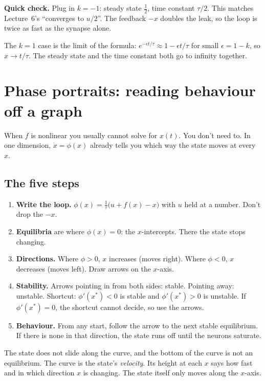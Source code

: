 \documentclass[11pt,letterpaper]{article}
\begin{document}
\textbf{Quick check.} Plug in $k = -1$: steady state $\tfrac12$, time constant $\tau/2$. This matches Lecture~6's ``converges to $u/2$''. The feedback $-x$ doubles the leak, so the loop is twice as fast as the synapse alone.

The $k = 1$ case is the limit of the formula: $e^{-\epsilon t/\tau} \approx 1 - \epsilon t/\tau$ for small $\epsilon = 1 - k$, so $x \to t/\tau$. The steady state and the time constant both go to infinity together.

\section{Phase portraits: reading behaviour off a graph}

When $f$ is nonlinear you usually cannot solve for $x(t)$. You don't need to. In one dimension, $\dot x = \phi(x)$ already tells you which way the state moves at every $x$.

\subsection*{The five steps}
\begin{enumerate}
\item \textbf{Write the loop.} $\phi(x) = \frac1\tau\bigl(u + f(x) - x\bigr)$ with $u$ held at a number. Don't drop the $-x$.
\item \textbf{Equilibria} are where $\phi(x) = 0$: the $x$-intercepts. There the state stops changing.
\item \textbf{Directions.} Where $\phi > 0$, $x$ increases (moves right). Where $\phi < 0$, $x$ decreases (moves left). Draw arrows on the $x$-axis.
\item \textbf{Stability.} Arrows pointing in from both sides: stable. Pointing away: unstable. Shortcut: $\phi'(x^*) < 0$ is stable and $\phi'(x^*) > 0$ is unstable. If $\phi'(x^*) = 0$, the shortcut cannot decide, so use the arrows.
\item \textbf{Behaviour.} From any start, follow the arrow to the next stable equilibrium. If there is none in that direction, the state runs off until the neurons saturate.
\end{enumerate}

\begin{trap}
The state does not slide along the curve, and the bottom of the curve is not an equilibrium. The curve is the state's \emph{velocity}. Its height at each $x$ says how fast and in which direction $x$ is changing. The state itself only moves along the $x$-axis.
\end{trap}
\end{document}
